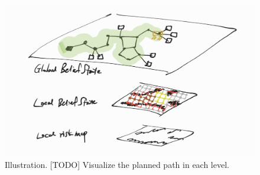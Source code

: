 \documentclass{article}
\begin{document}
\begin{figure}[t!]
  \centering
  \includegraphics[width=.6\textwidth]{IRM_Planning/figures/sketch_hierarchical_belief_space.png}
  \caption{Illustration. [TODO] Visualize the planned path in each level.}
  \label{fig:illustration}
\end{figure}








\end{document}
